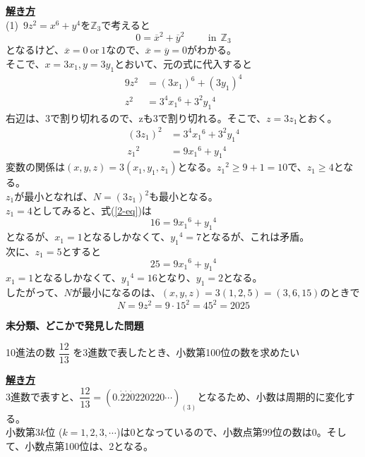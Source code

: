 \documentclass[11pt]{article}
\begin{document}
\underline{\textbf{解き方}}\\
(1)\ $9z^2 = x^6 + y^4$を$\mathbb{Z}_3$で考えると
\begin{equation*}
0= \overline{x}^2 + \overline{y}^2 \hspace{1cm} \mathrm{in} \ \ \mathbb{Z}_3
\end{equation*}
となるけど、$\overline{x} = 0\ \mathrm{or} \ 1$なので、$\overline{x}=\overline{y}=0$がわかる。\\
そこで、$x=3x_1 , y=3y_1$とおいて、元の式に代入すると\\
\begin{align*}
9z^2 &= {(3x_1)}^6 + {(3y_1)}^4\\
z^2 &= 3^4 {x_1}^6 + 3^2 {y_1}^4
\end{align*}
右辺は、3で割り切れるので、zも3で割り切れる。そこで、$z=3z_1$とおく。
\begin{align}
{(3z_1)}^2 &= 3^4 {x_1}^6 + 3^2 {y_1}^4 \nonumber \\
{z_1}^2 &= 9 {x_1}^6 + {y_1}^4 \label{2-eq}
\end{align}
変数の関係は$(x,y,z)=3(x_1 , y_1 , z_1)$となる。${z_1}^2 \geq 9+1 =10$で、$z_1 \geq 4$となる。\\
$z_1$が最小となれば、$N={(3z_1)}^2$も最小となる。\\
$z_1 = 4$としてみると、式(\ref{2-eq})は
\begin{equation*}
16 = 9 {x_1}^6 + {y_1}^4
\end{equation*}
となるが、$x_1=1$となるしかなくて、${y_1}^4 =7$となるが、これは矛盾。\\
次に、$z_1 = 5$とすると
\begin{equation*}
25 = 9 {x_1}^6 + {y_1}^4
\end{equation*}
$x_1=1$となるしかなくて、${y_1}^4 = 16$となり、$y_1=2$となる。\\
したがって、$N$が最小になるのは、$(x,y,z)=3(1,2,5)=(3,6,15)$のときで
\begin{equation*}
N=9z^2=9 \cdot 15^2 = 45^2 =2025
\end{equation*}

\newpage
\begin{center}
{\LARGE \textbf{未分類、どこかで発見した問題}}
\end{center}

\begin{tcolorbox}[mybox={駿台の整数完全攻略の見本画像より}]
10進法の数 $\dfrac{12}{13}$ を3進数で表したとき、小数第100位の数を求めたい
\end{tcolorbox}

\underline{\textbf{解き方}}\\
3進数で表すと、$\dfrac{12}{13} = ( 0. \dot{2} \dot{2} \dot{0} 220220 \cdots )_{(3)}$となるため、小数は周期的に変化する。\\
小数第$3k$位 ($k=1,2,3,\cdots$)は0となっているので、小数点第99位の数は0。そして、小数点第100位は、2となる。
\end{document}
